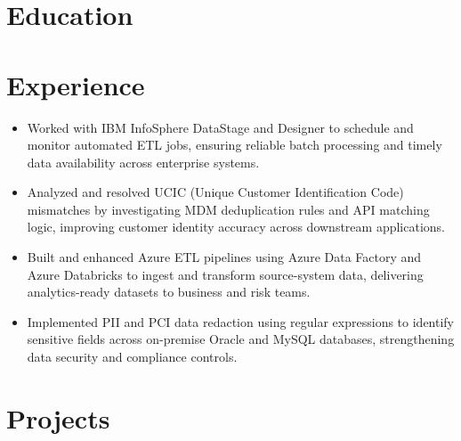 \documentclass{resume}
\begin{document}

\section{Education}
\begin{itemize}
\end{itemize}

\section{Experience}
\begin{itemize}
  \item Worked with IBM InfoSphere DataStage and Designer to schedule and monitor automated ETL jobs, ensuring reliable batch processing and timely data availability across enterprise systems.
  \item Analyzed and resolved UCIC (Unique Customer Identification Code) mismatches by investigating MDM deduplication rules and API matching logic, improving customer identity accuracy across downstream applications.
  \item Built and enhanced Azure ETL pipelines using Azure Data Factory and Azure Databricks to ingest and transform source-system data, delivering analytics-ready datasets to business and risk teams.
  \item Implemented PII and PCI data redaction using regular expressions to identify sensitive fields across on-premise Oracle and MySQL databases, strengthening data security and compliance controls.
\end{itemize}

\section{Projects}
\end{document}

